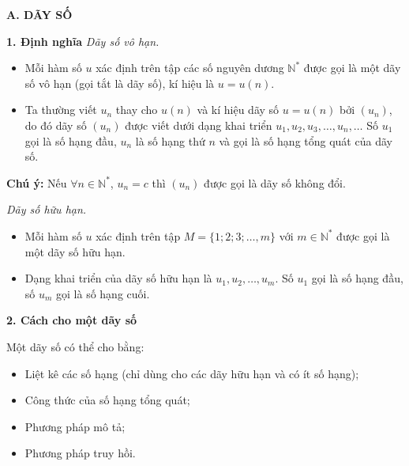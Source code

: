 \documentclass[12pt,a4paper]{extarticle}
\begin{document}
\makeheadbox[headerright={Tổng ôn 10-11},chude={CHỦ ĐỀ 07},tieude={Dãy số},dinhdang={Đại số},lop={12 },gv={Nguyễn Lê Minh Ngọc}]

\vspace{2em}
\noindent\textbf{A. DÃY SỐ}

\noindent\textbf{1. Định nghĩa}
\vspace{0.2cm}
\noindent\textit{Dãy số vô hạn.}
\begin{itemize}
    \item Mỗi hàm số $u$ xác định trên tập các số nguyên dương $\mathbb{N}^*$ được gọi là một dãy số vô hạn (gọi tắt là dãy số), kí hiệu là $u = u(n)$.
    \item Ta thường viết $u_n$ thay cho $u(n)$ và kí hiệu dãy số $u = u(n)$ bởi $(u_n)$, do đó dãy số $(u_n)$ được viết dưới dạng khai triển $u_1, u_2, u_3, \dots, u_n, \dots$ Số $u_1$ gọi là số hạng đầu, $u_n$ là số hạng thứ $n$ và gọi là số hạng tổng quát của dãy số.
\end{itemize}
\noindent\textbf{Chú ý:} Nếu $\forall n \in \mathbb{N}^*$, $u_n = c$ thì $(u_n)$ được gọi là dãy số không đổi.
\vspace{0.4cm}

\vspace{0.4cm}
\noindent\textit{Dãy số hữu hạn.}
\begin{itemize}
    \item Mỗi hàm số $u$ xác định trên tập $M = \{1; 2; 3; \dots, m\}$ với $m \in \mathbb{N}^*$ được gọi là một dãy số hữu hạn.
    \item Dạng khai triển của dãy số hữu hạn là $u_1, u_2, \dots, u_m$. Số $u_1$ gọi là số hạng đầu, số $u_m$ gọi là số hạng cuối.
\end{itemize}
\vspace{0.4cm}

\noindent\textbf{2. Cách cho một dãy số}

\noindent Một dãy số có thể cho bằng:
\begin{itemize}
    \item Liệt kê các số hạng (chỉ dùng cho các dãy hữu hạn và có ít số hạng);
    \item Công thức của số hạng tổng quát;
    \item Phương pháp mô tả;
    \item Phương pháp truy hồi.
\end{itemize}
\end{document}
